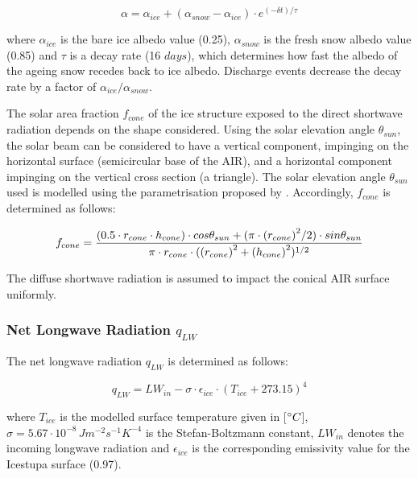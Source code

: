 \begin{equation} \alpha=\alpha_{ice}+(\alpha_{snow}-\alpha_{ice}) \cdot e^{(-\delta t)/\tau} \label{eqn:a}
\end{equation}

where $\alpha_{ice}$ is the bare ice albedo value (0.25), $\alpha_{snow}$ is the fresh snow albedo value (0.85)
and $\tau$ is a decay rate (16 $days$), which determines how fast the albedo of the ageing snow recedes back to
ice albedo. Discharge events decrease the decay rate by a factor of $\alpha_{ice}/\alpha_{snow}$. 

The solar area fraction $f_{cone}$ of the ice structure exposed to the direct shortwave radiation depends on the shape
considered. Using the solar elevation angle $\theta_{sun}$, the solar beam can be considered to have a vertical
component, impinging on the horizontal surface (semicircular base of the AIR), and a horizontal component
impinging on the vertical cross section (a triangle). The solar elevation angle $\theta_{sun}$ used is modelled
using the parametrisation proposed by \cite{woolfComputationSolarElevation1968}. Accordingly, $f_{cone}$ is determined as follows:

\begin{equation}
	\begin{split}
		f_{cone}& =\frac{(0.5 \cdot r_{cone} \cdot h_{cone}) \cdot cos \theta_{sun} +(\pi \cdot
			{(r_{cone})}^2/2) \cdot sin \theta_{sun} }{\pi \cdot r_{cone} \cdot ({(r_{cone})}^2+{(h_{cone})}^2)^{1/2}}\\
	\end{split}
	\label{eqn:f_{cone} }
\end{equation}

The diffuse shortwave radiation is assumed to impact the conical AIR surface uniformly.

\subsubsection{Net Longwave Radiation \texorpdfstring{$q_{LW}$}{Lg}} \label{sec:LW}

The net longwave radiation $q_{LW}$ is determined as follows:

\begin{equation}
	q_{LW}= LW_{in}-\sigma \cdot \epsilon_{ice} \cdot {(T_{ice}+ 273.15)}^4
	\label{eqn:LW}
\end{equation}

where $T_{ice}$ is the modelled surface temperature given in [$^{\circ} C$],
$\sigma=5.67\cdot10^{-8}\,Jm^{-2}s^{-1}K^{-4}$ is the Stefan-Boltzmann constant, $LW_{in}$ denotes the incoming
longwave radiation and $\epsilon_{ice}$ is the corresponding emissivity value for the Icestupa surface (0.97).

